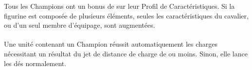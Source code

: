 Tous les Champions ont un bonus de  sur leur Profil de Caractéristiques. Si la figurine est composée de plusieurs éléments, seules les caractéristiques du cavalier, ou d'un seul membre d'équipage, sont augmentées.

\paragraph{}

Une unité contenant un Champion réussit automatiquement les charges nécessitant un résultat du jet de distance de charge de  ou moins. Sinon, elle lance les dés normalement.

